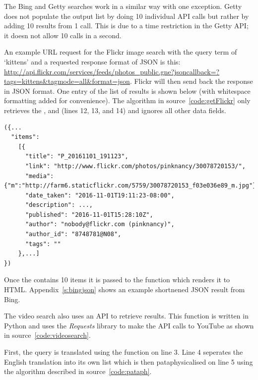 The Bing and Getty searches work in a similar way with one exception. Getty does not populate the output list by doing 10 individual \ac{API} calls but rather by adding 10 results from 1 call. This is due to a time restriction in the Getty \ac{API}; it doesn not allow 10 calls in a second.

\spirals

An example \ac{URL} request for the Flickr image search with the query term of `kittens' and a requested response format of \ac{JSON} is this:
\url{http://api.flickr.com/services/feeds/photos_public.gne?jsoncallback=?tags=kittens&tagmode=all&format=json}. Flickr will then send back the response in \ac{JSON} format. One entry of the list of results is shown below (with whitespace formatting added for convenience). The algorithm in source~\ref{code:getFlickr} only retrieves the ,  and  (lines 12, 13, and 14) and ignores all other data fields.

\begin{verbatim}
({...
  "items": 
    [{
      "title": "P_20161101_191123",
      "link": "http://www.flickr.com/photos/pinknancy/30078720153/",
      "media": {"m":"http://farm6.staticflickr.com/5759/30078720153_f03e036e89_m.jpg"},
      "date_taken": "2016-11-01T19:11:23-08:00",
      "description": ...,
      "published": "2016-11-01T15:28:10Z",
      "author": "nobody@flickr.com (pinknancy)",
      "author_id": "8748781@N08",
      "tags": ""
    },...]
})
\end{verbatim}

Once the  contains 10 items it is passed to the  function which renders it to \ac{HTML}. Appendix~\ref{s:bingjson} shows an example shortnened \ac{JSON} result from Bing.

\spirals

The video search also uses an \ac{API} to retrieve results. This function is written in Python and uses the \textit{Requests} library \autocite{Reitznd} to make the \ac{API} calls to YouTube \autocite{YouTubeAPI} as shown in source~\ref{code:videosearch}.

First, the query is translated using the  function on line 3. Line 4 seperates the English translation into its own list  which is then pataphysicalised on line 5 using the algorithm described in source~\ref{code:pataph}.

